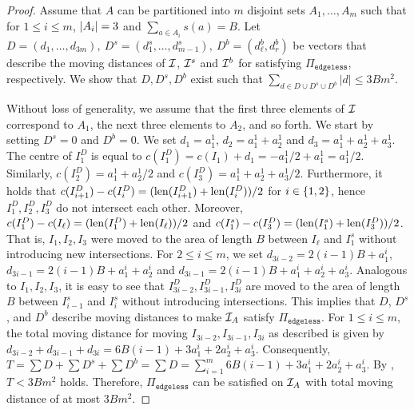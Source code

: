\begin{proof}
    Assume that $A$ can be partitioned into $m$ disjoint sets $A_1,\ldots,A_m$ such that for $1\le i \le m$, $|A_i| = 3$ and $\sum_{a\in A_i} s(a) = B$.
    Let $D = (d_1,\ldots,d_{3m}),\:D^s = (d^s_{1},\ldots, d^s_{m-1}),\:D^b = (d^b_\ell, d^b_r)$ be vectors that describe the moving distances of $\mathcal{I}$, $\mathcal{I}^s$ and $\mathcal{I}^b$ for satisfying $\Pi_{\texttt{edgeless}}$, respectively.
    We show that $D,D^s,D^b$ exist such that $\sum_{d\in D\cup D^s \cup D^b} |d| \le 3Bm^2$.
    
    Without loss of generality, we assume that the first three elements of $\mathcal{I}$ correspond to $A_1$, the next three elements to $A_2$, and so forth.
    We start by setting $D^s = 0$ and $D^b = 0$.
    We set $d_1 = a^1_1 $, $d_2 = a^1_1 + a^1_2 $ and $d_3 = a^1_1 + a^1_2 + a^1_3$.
    The centre of $I^D_1$ is equal to $c(I^D_1) = c(I_1) + d_1 = -a^1_1/2 + a^1_1 = a^1_1/2$.
    Similarly, $c(I^D_2) = a^1_1 + a^1_2/2$ and $c(I^D_3) = a^1_1 + a^1_2 + a^1_3/2$.
    Furthermore, it holds that $c(I^D_{i+1}) - c(I^D_i) = (\mathrm{len}(I^D_{i+1})+\mathrm{len}(I^D_i))/2$ for $i\in \{1,2\}$, hence $I^D_1,I^D_2,I^D_3$ do not intersect each other.
    Moreover, $c(I^D_1) - c(I_\ell) = (\mathrm{len}(I^D_1)+\mathrm{len}(I_\ell))/2$ and $c(I^s_1) - c(I^D_3) = (\mathrm{len}(I^s_1)+\mathrm{len}(I^D_3))/2$.
    That is, $I_1,I_2,I_3$ were moved to the area of length $B$ between $I_\ell$ and $I^s_1$ without introducing new intersections.
    For $2 \le i \le m$, we set $d_{3i-2} = 2(i-1)B + a^i_1$, $d_{3i-1} = 2(i-1)B + a^i_1 + a^i_2$ and $d_{3i-1} = 2(i-1)B + a^i_1 + a^i_2 + a^i_3$.
    Analogous to $I_1,I_2,I_3$, it is easy to see that $I^D_{3i-2}, I^D_{3i-1}, I^D_{3i}$ are moved to the area of length $B$ between $I^s_{i-1}$ and $I^s_{i}$ without introducing intersections.
    This implies that $D$, $D^s$, and $D^b$ describe moving distances to make $\mathcal{I}_A$ satisfy $\Pi_{\texttt{edgeless}}$.
    For $1\le i \le m$, the total moving distance for moving $I_{3i-2},I_{3i-1},I_{3i}$ as described is given by $d_{3i-2}+d_{3i-1}+d_{3i} = 6B(i-1) + 3a^i_1+2a^i_2+a^i_3$.
    Consequently, $T = \sum D + \sum D^s + \sum D^b = \sum D = \sum_{i=1}^m 6B(i-1) + 3a^i_1+2a^i_2+a^i_3$.
    By , $T< 3Bm^2$ holds.
    Therefore, $\Pi_{\texttt{edgeless}}$ can be satisfied on $\mathcal{I}_A$ with total moving distance of at most $3Bm^2$.


\end{proof}
